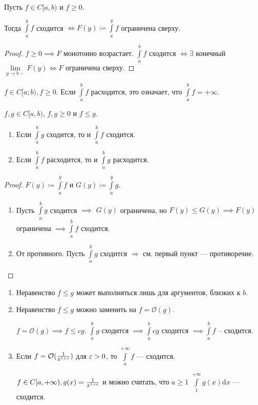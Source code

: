 \begin{theorem}
    Пусть  $f \in C[a, b)$ и  $f \ge 0$. 

    Тогда $\int\limits_a^b f$ сходится  $\iff F(y) \coloneqq \int\limits_a^y f$ ограничена сверху.
\end{theorem}
\begin{proof}
    $f \ge 0 \implies F$ монотонно возрастает. $\int\limits_a^b f$ сходится  $\iff \exists$ конечный  $\lim\limits_{y \to b-}F(y) \iff F$ ограничена сверху. 
\end{proof}
\begin{remark}
    $f \in C[a; b), f\ge 0$. Если $\int\limits_a^b f$ расходится, это означает, что  $\int\limits_a^b f = +\infty$.
\end{remark}
\begin{consequence}
    $f, g \in C[a, b)$,  $f, g \ge 0$ и $f \le g$.
    \begin{enumerate}
        \item Если $\int\limits_a^b g$ сходится, то и $\int\limits_a^b f$ сходится.
        \item Если  $\int\limits_a^b f$ расходится, то и $\int\limits_a^b g$ расходится.
    \end{enumerate}
\end{consequence}
\begin{proof}
    $F(y) \coloneqq \int\limits_a^y f$ и  $G(y) \coloneqq \int\limits_a^y g$.
     \begin{enumerate}
         \item Пусть $\int\limits_a^b g$ сходится  $\implies$  $G(y)$ ограничена, но  $F(y) \le G(y) \implies F(y)$ ограничена $\implies \int\limits_a^b f$ сходится.
         \item От противного. Пусть $\int\limits_a^b g$ сходится $\Rightarrow$ см. первый пункт --- противоречие.
    \end{enumerate}
\end{proof}
\begin{remark}
    \begin{enumerate}
        \item Неравенство $f \le g$ может выполняться лишь для аргументов, близких к $b$.
        \item Неравенство  $f \le g$ можно заменить на $f = \mathcal{O}(g)$.

            $f = \mathcal{O}(g) \implies f \le cg$. $\int\limits_a^b g$ сходится  $\implies \int\limits_a^b cg $ сходится  $\implies \int\limits_a^b f$ -- сходится.
        \item Если  $f = \mathcal{O}(\frac{1}{x^{1 + \varepsilon}})$ для $\varepsilon > 0$, то  $\int\limits_a^{+\infty} f$ --- сходится.

            $f \in C[a, +\infty),  g(x) = \frac{1}{x^{1+\varepsilon}}$ и можно считать, что $a \ge 1$ $\int\limits_1^{+\infty} g(x) \mathrm{d}x$ --- сходится.
    \end{enumerate}
\end{remark}
